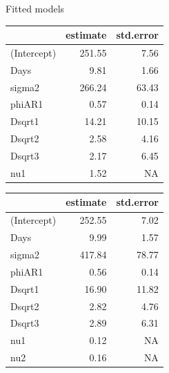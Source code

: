 \documentclass[
  ignorenonframetext,
]{beamer}
\newenvironment{Shaded}{\begin{snugshade}}{\end{snugshade}}
\newcommand{\CommentTok}[1]{\textcolor[rgb]{0.56,0.35,0.01}{\textit{#1}}}
\newcommand{\DataTypeTok}[1]{\textcolor[rgb]{0.13,0.29,0.53}{#1}}
\newcommand{\DecValTok}[1]{\textcolor[rgb]{0.00,0.00,0.81}{#1}}
\newcommand{\KeywordTok}[1]{\textcolor[rgb]{0.13,0.29,0.53}{\textbf{#1}}}
\newcommand{\NormalTok}[1]{#1}
\newcommand{\OperatorTok}[1]{\textcolor[rgb]{0.81,0.36,0.00}{\textbf{#1}}}
\newcommand{\StringTok}[1]{\textcolor[rgb]{0.31,0.60,0.02}{#1}}
\begin{document}
\begin{frame}[fragile]{Fitted models}
\protect\hypertarget{fitted-models}{}

\scriptsize

\begin{Shaded}
\end{Shaded}

\begin{longtable}[]{@{}lrr@{}}
\toprule
& estimate & std.error\tabularnewline
\midrule
\endhead
(Intercept) & 251.55 & 7.56\tabularnewline
Days & 9.81 & 1.66\tabularnewline
sigma2 & 266.24 & 63.43\tabularnewline
phiAR1 & 0.57 & 0.14\tabularnewline
Dsqrt1 & 14.21 & 10.15\tabularnewline
Dsqrt2 & 2.58 & 4.16\tabularnewline
Dsqrt3 & 2.17 & 6.45\tabularnewline
nu1 & 1.52 & NA\tabularnewline
\bottomrule
\end{longtable}

\end{frame}

\begin{frame}[fragile]

\scriptsize

\begin{Shaded}
\end{Shaded}

\begin{longtable}[]{@{}lrr@{}}
\toprule
& estimate & std.error\tabularnewline
\midrule
\endhead
(Intercept) & 252.55 & 7.02\tabularnewline
Days & 9.99 & 1.57\tabularnewline
sigma2 & 417.84 & 78.77\tabularnewline
phiAR1 & 0.56 & 0.14\tabularnewline
Dsqrt1 & 16.90 & 11.82\tabularnewline
Dsqrt2 & 2.82 & 4.76\tabularnewline
Dsqrt3 & 2.89 & 6.31\tabularnewline
nu1 & 0.12 & NA\tabularnewline
nu2 & 0.16 & NA\tabularnewline
\bottomrule
\end{longtable}

\end{frame}
\end{document}
